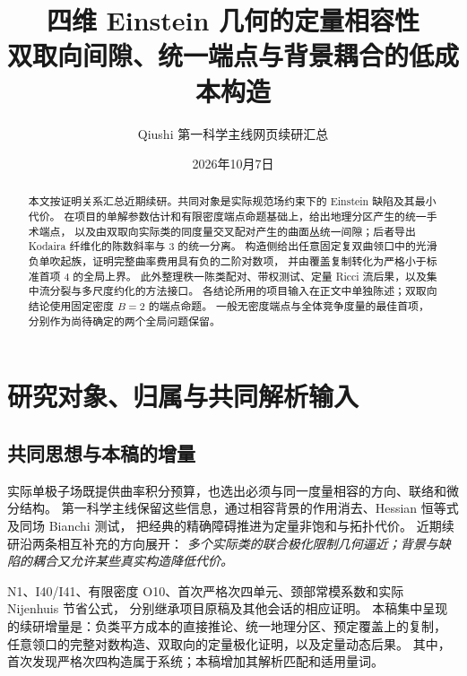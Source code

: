 \documentclass[UTF8,11pt,a4paper,fontset=none]{ctexart}
\title{\textbf{四维 Einstein 几何的定量相容性}\\[4pt]
\large 双取向间隙、统一端点与背景耦合的低成本构造}
\author{Qiushi 第一科学主线\quad 网页续研汇总}
\date{2026年10月7日}
\numberwithin{equation}{section}
\theoremstyle{definition}
\theoremstyle{remark}\newtheorem{remark}[theorem]{说明}
\begin{document}
\maketitle
\begin{abstract}
本文按证明关系汇总近期续研。共同对象是实际规范场约束下的 Einstein 缺陷及其最小代价。
在项目的单解参数估计和有限密度端点命题基础上，给出地理分区产生的统一手术端点，
以及由双取向实际类的同度量交叉配对产生的曲面丛统一间隙；后者导出 Kodaira 纤维化的陈数斜率与 $3$ 的统一分离。
构造侧给出任意固定复双曲领口中的光滑负单吹起族，证明完整曲率费用具有负的二阶对数项，
并由覆盖复制转化为严格小于标准首项 $4$ 的全局上界。
此外整理秩一陈类配对、带权测试、定量 Ricci 流后果，以及集中流分裂与多尺度约化的方法接口。
各结论所用的项目输入在正文中单独陈述；双取向结论使用固定密度 $B=2$ 的端点命题。
一般无密度端点与全体竞争度量的最佳首项，分别作为尚待确定的两个全局问题保留。
\end{abstract}
\tableofcontents

\section{研究对象、归属与共同解析输入}\label{sec:framework}

\subsection{共同思想与本稿的增量}
实际单极子场既提供曲率积分预算，也选出必须与同一度量相容的方向、联络和微分结构。
第一科学主线保留这些信息，通过相容背景的作用消去、Hessian 恒等式及同场 Bianchi 测试，
把经典的精确障碍推进为定量非饱和与拓扑代价。
近期续研沿两条相互补充的方向展开：
\emph{多个实际类的联合极化限制几何逼近；背景与缺陷的耦合又允许某些真实构造降低代价。}

N1、I40/I41、有限密度 O10、首次严格次四单元、颈部常模系数和实际 Nijenhuis 节省公式，
分别继承项目原稿及其他会话的相应证明\cite{N1,FD,System,Field}。
本稿集中呈现的续研增量\cite{WebRecent}是：负类平方成本的直接推论、统一地理分区、预定覆盖上的复制，
任意领口的完整对数构造、双取向的定量极化证明，以及定量动态后果。
其中，首次发现严格次四构造属于系统；本稿增加其解析匹配和适用量词。
\end{document}
